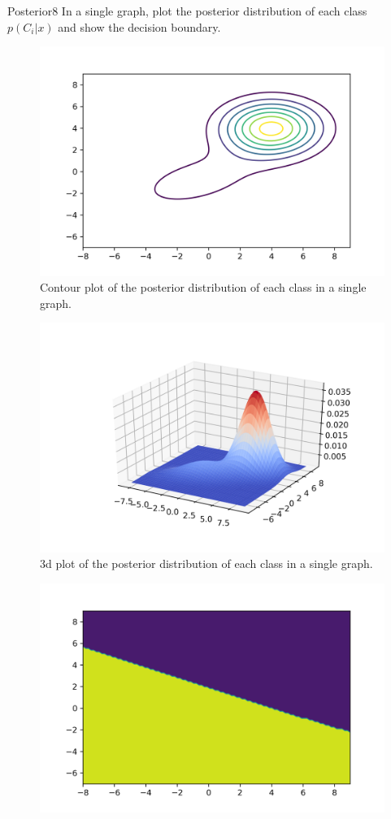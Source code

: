 \begin{questions}
\begin{question}{Posterior}{8}
In a single graph, plot the posterior distribution of each class $p(C_i|x)$ and show the decision boundary. 
\begin{figure}[]
	\includegraphics[width=0.8\linewidth]{pictures/posterior_contour.png}
	\centering
	\caption{Contour plot of the posterior distribution of each class in a single graph.}
	\label{fig:posterior_contour}
\end{figure}
\begin{figure}[]
	\includegraphics[width=0.8\linewidth]{pictures/posterior_3d.png}
	\centering
	\caption{3d plot of the posterior distribution of each class in a single graph.}
	\label{fig:posterior_3d}
\end{figure}
\begin{figure}[]
	\includegraphics[width=0.8\linewidth]{pictures/decision_small.png}

\end{figure}
\end{question}
\end{questions}
